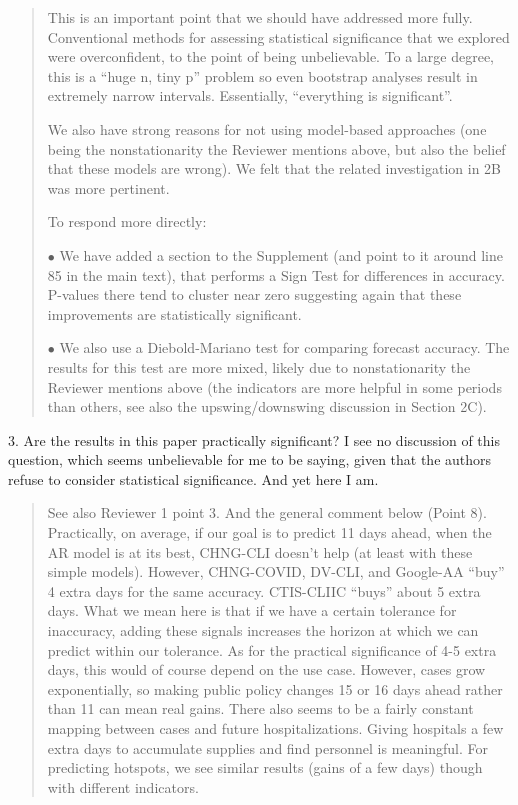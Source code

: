 \documentclass[11pt]{article}
\newenvironment{resp}{\begin{quote}\color{cobalt}}{\end{quote}}
\begin{document}
\begin{resp}
  This is an important point that we should have addressed more fully.
  Conventional methods for assessing statistical significance that we explored
  were overconfident, to the point of being unbelievable. To a large degree,
  this is a ``huge n, tiny p'' problem so even bootstrap analyses result in
  extremely narrow intervals. Essentially, ``everything is significant''.

  We also have strong reasons for not using model-based approaches (one being the
  nonstationarity the Reviewer mentions above, but also the belief that these
  models are wrong). We felt that the related investigation in 2B was more
  pertinent.

  To respond more directly:

  $\bullet$ We have added a section to the Supplement (and point
  to it around 
  line 85 in the main text), that performs a Sign Test for differences in
  accuracy. P-values there tend to cluster near zero suggesting again that these
  improvements are statistically significant.

  $\bullet$ We also use a Diebold-Mariano test
  for comparing forecast accuracy. The results for this test are more mixed,
  likely due to nonstationarity the Reviewer mentions above (the indicators are
  more helpful in some periods than others, see also the upswing/downswing
  discussion in Section 2C). 
\end{resp}

3. Are the results in this paper practically significant? I see no discussion of
this question, which seems unbelievable for me to be saying, given that the
authors refuse to consider statistical significance. And yet here I am.

\begin{resp}
  See also Reviewer 1 point 3. And the general comment below (Point 8).
  Practically, on average, if our goal is to predict 11 days ahead, when the AR
  model is at its best, CHNG-CLI
  doesn’t help (at least with these simple models). However, CHNG-COVID,
  DV-CLI, and Google-AA ``buy'' 4 extra days for the 
  same accuracy. CTIS-CLIIC ``buys'' about 5 extra days. What we mean here is
  that if we have a certain tolerance for inaccuracy, adding these signals increases the
  horizon at which we can predict within our tolerance. As for the
  practical significance of 4-5 extra days, this would of course depend on the use case.  However, cases grow
  exponentially, so making public policy changes 15 or 16 days ahead rather than
  11 can mean real gains. There also seems to be a fairly constant mapping
  between cases and future hospitalizations. Giving
  hospitals a few extra days to accumulate supplies and find personnel is
  meaningful. For predicting hotspots, we see similar results (gains of a few
  days) though with different indicators. 
\end{resp}
\end{document}
